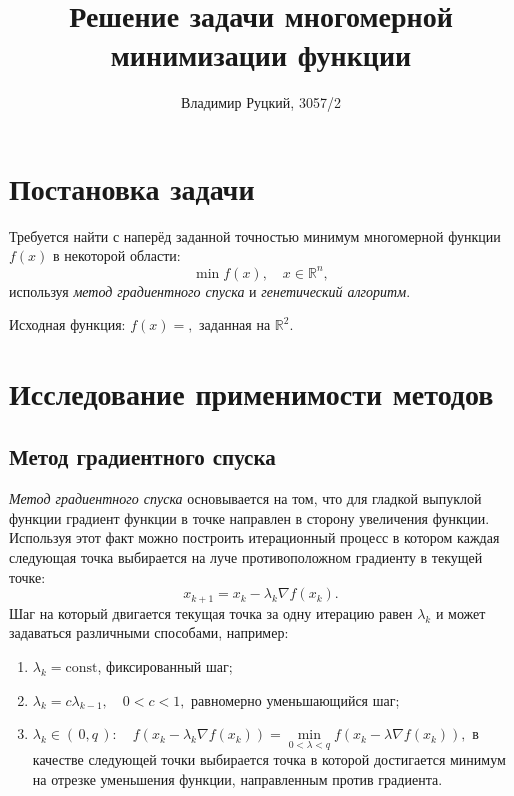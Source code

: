 \documentclass[10pt,a4paper,titlepage]{article}
\title{Решение задачи многомерной минимизации функции}
\author{Владимир Руцкий, 3057/2}
\newcommand\RR{\mathbb{R}}
\begin{document}
\maketitle
\thispagestyle{empty}

\section{Постановка задачи}
Требуется найти с наперёд заданной точностью минимум многомерной функции $f(x)$ в некоторой области:
$$ \min f(x), \quad x \in \RR^n, $$
используя \textit{метод градиентного спуска} и \textit{генетический алгоритм}.

Исходная функция: $f(x) = ,$ заданная на $\RR^2$. %

\section{Исследование применимости методов}
\subsection{Метод градиентного спуска}
\label{GradientDescentMethodConditions}
\textit{Метод градиентного спуска} основывается на том, что для гладкой выпуклой функции градиент функции в точке направлен
в сторону увеличения функции.
Используя этот факт можно построить итерационный процесс в котором каждая следующая точка выбирается на луче противоположном
градиенту в текущей точке:
$$ x_{k+1} = x_k - \lambda_k \nabla f(x_k). $$
Шаг на который двигается текущая точка за одну итерацию равен $\lambda_k$ и может задаваться различными способами, например:
\begin{enumerate}
  \item $\lambda_k = \mathrm{const}$, фиксированный шаг;
  \item $\lambda_k = c \lambda_{k-1}, \quad 0 < c < 1,$ равномерно уменьшающийся шаг;
  \item $\lambda_k \in (\,0, q\,)\!: 
    \quad f(x_k - \lambda_k \nabla f(x_k)) = \min\limits_{0 < \lambda < q} f(x_k - \lambda \nabla f(x_k)),$
    в качестве следующей точки выбирается точка в которой достигается минимум на отрезке уменьшения функции,
    направленным против градиента.
\end{enumerate}


\end{document}
